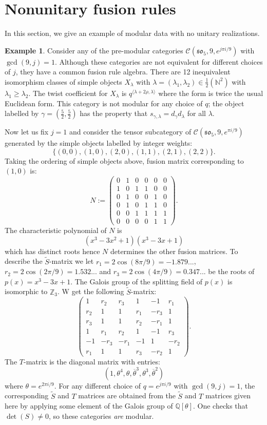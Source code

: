 \documentclass[12pt,psamsfonts]{amsart}
\newcommand{\lan}{\langle}
\newcommand{\ra}{\rangle}
\newcommand{\la}{\lambda}
\newcommand{\N}{\mathbb{N}}
\newcommand{\Q}{\mathbb Q}
\newcommand{\Z}{\mathbb Z}
\newcommand{\tS}{\tilde{S}}
\numberwithin{equation}{section}
\theoremstyle{definition}
\newtheorem{ex}[theorem]{Example}
\begin{document}
\fi

\iffalse

\section{Nonunitary fusion rules}\label{nonunitary}

In this section, we give an example of modular data with no
unitary realizations.

\begin{ex}
Consider any of the pre-modular categories
$\mathcal{C}(\mathfrak{so}_5,9,e^{j\pi i/9})$ with  $\gcd(9,j)=1$.
Although these categories are not equivalent for different choices
of $j$, they have a common fusion rule algebra. There are 12
inequivalent isomorphism classes of simple objects $X_\la$ with
$\la=(\lambda_1,\lambda_2)\in\frac{1}{2}(\N^2)$ with
$\lambda_1\geq\lambda_2$.  The twist coefficient for $X_\la$ is
$q^{\lan \lambda+2\rho,\lambda\ra}$ where the form is twice the
usual Euclidean form.  This category is not modular for any choice
of $q$; the object labelled by $\gamma=(\frac{5}{2},\frac{5}{2})$
has the property that $s_{\gamma,\la}=d_\gamma d_\la$ for all
$\la$.

Now let us fix $j=1$ and consider the tensor subcategory of
$\mathcal{C}(\mathfrak{so}_5,9,e^{\pi i/9})$ generated by the
simple objects labelled by integer weights:
$$\{(0,0),(1,0),(2,0),(1,1),(2,1),(2,2)\}.$$  Taking the ordering of
simple objects above, fusion matrix corresponding to $(1,0)$ is:
$$N:=\begin{pmatrix}
0&1&0&0&0&0\\ 1&0&1&1&0&0\\
0&1&0&0&1&0\\0&1&0&1&1&0
\\0&0&1&1&1&1\\0&0&0&0&1&1
\end{pmatrix}.$$
The characteristic polynomial of $N$ is
$$(x^3-3x^2+1)(x^3-3x+1)$$ which has distinct roots hence $N$ determines
the other fusion matrices.  To describe the $\tS$-matrix we let
$r_1=2\cos(8\pi/9)=-1.879...$, $r_2=2\cos(2\pi/9)=1.532...$ and
$r_3=2\cos(4\pi/9)=0.347...$ be the roots of $p(x)=x^3-3x+1$.  The
Galois group of the splitting field of $p(x)$ is isomorphic to
$\Z_3$.  W get the following $\tS$-matrix:
$$\begin{pmatrix}
1&r_2& r_3&1&-1&r_1
\\r_2&1&1&r_1&-r_3&1
\\r_3&1&1&r_2&-r_1&1
\\ 1&r_1&r_2&1&-1
&r_3
\\-1&-r_3&-r_1&-1&1&-r_2\\r_1&1&1&r_3&-r_2&1
\end{pmatrix}.$$
The $T$-matrix is the diagonal matrix with entries:
$$(1,\theta^4,\theta,\overline{\theta}^3,\theta^3,\overline{\theta}^2)$$
where $\theta=e^{2\pi i/9}$.  For any different choice of
$q=e^{j\pi i/9}$ with $\gcd(9,j)=1$, the corresponding $\tS$ and
$T$ matrices are obtained from the $\tS$ and $T$ matrices given
here by applying some element of the Galois group of $\Q[\theta]$.
One checks that $\det(S)\not=0$, so these categories \emph{are}
modular.


\end{ex}
\end{document}
